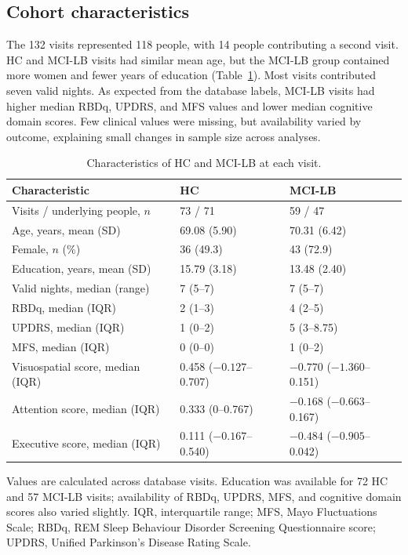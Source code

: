 \documentclass[referee,pdflatex,sn-vancouver-num]{sn-jnl}
\begin{document}
\subsection{Cohort characteristics}\label{subsec:cohort-results}

The 132 visits represented 118 people, with 14 people contributing a second
visit. HC and MCI-LB visits had similar mean age, but the MCI-LB group contained
more women and fewer years of education (Table~\ref{tab:characteristics}). Most
visits contributed seven valid nights. As expected from the database labels,
MCI-LB visits had higher median RBDq, UPDRS, and MFS values and lower median
cognitive domain scores. Few clinical values were missing, but availability
varied by outcome, explaining small changes in sample size across analyses.

\begin{table}[t]
\caption{Characteristics of HC and MCI-LB at each visit.}
\label{tab:characteristics}
\centering
\small
\begin{tabular}{@{}lll@{}}
\toprule
Characteristic & HC & MCI-LB \\
\midrule
Visits / underlying people, $n$ & 73 / 71 & 59 / 47 \\
Age, years, mean (SD) & 69.08 (5.90) & 70.31 (6.42) \\
Female, $n$ (\%) & 36 (49.3) & 43 (72.9) \\
Education, years, mean (SD) & 15.79 (3.18) & 13.48 (2.40) \\
Valid nights, median (range) & 7 (5--7) & 7 (5--7) \\
RBDq, median (IQR) & 2 (1--3) & 4 (2--5) \\
UPDRS, median (IQR) & 1 (0--2) & 5 (3--8.75) \\
MFS, median (IQR) & 0 (0--0) & 1 (0--2) \\
Visuospatial score, median (IQR) & 0.458 ($-0.127$--0.707) & $-0.770$ ($-1.360$--0.151) \\
Attention score, median (IQR) & 0.333 (0--0.767) & $-0.168$ ($-0.663$--0.167) \\
Executive score, median (IQR) & 0.111 ($-0.167$--0.540) & $-0.484$ ($-0.905$--0.042) \\
\bottomrule
\end{tabular}

\medskip
\begin{minipage}{0.94\linewidth}\footnotesize
Values are calculated across database visits. Education was available for 72
HC and 57 MCI-LB visits; availability of RBDq, UPDRS, MFS, and cognitive domain scores
also varied slightly. IQR, interquartile range; MFS, Mayo Fluctuations Scale;
RBDq, REM Sleep Behaviour Disorder Screening Questionnaire score; UPDRS,
Unified Parkinson's Disease Rating Scale.
\end{minipage}
\end{table}
\end{document}
